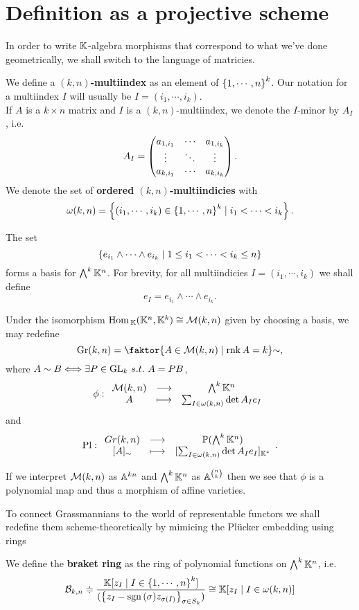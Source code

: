 \section{Definition as a projective scheme}
In order to write $\mathbb{K}$-algebra morphisms that correspond to what we've done geometrically, we shall switch to the language of matricies.
\begin{definition}[Multiindicies]
We define a \textbf{$(k,n)$-multiindex} as an element of $\left\{{1,\cdots, n}\right\}^k$. Our notation for a multiindex $I$ will usually be $I=(i_1,\cdots, i_k)$.\\
If $A$ is a $k\times n$ matrix and $I$ is a $(k,n)$-multiindex, we denote the $I$-minor by $A_I$, i.e.
\[A_I=\begin{pmatrix}a_{1,i_1} &\cdots &a_{1,i_{k}}\\\vdots &\ddots &\vdots\\a_{k,i_1}&\cdots&a_{k,i_k}\end{pmatrix}.\]
We denote the set of \textbf{ordered $(k,n)$-multiindicies} with
\[\omega(k,n)=\left\{{(i_1,\cdots, i_k)\in \left\{{1,\cdots, n}\right\}^k\mid i_1<\cdots<i_k}\right\}.\]
\end{definition}

\begin{remark}
The set
\[\left\{{e_{i_1}\wedge\cdots\wedge e_{i_k}\mid 1\leq i_1<\cdots<i_k\leq n}\right\}\]
forms a basis for $\bigwedge^k\mathbb{K}^n$. For brevity, for all multiindicies $I=(i_1,\cdots, i_k)$ we shall define
\[e_I=e_{i_1}\wedge\cdots\wedge e_{i_k}.\]
\end{remark}
\medskip

\noindent
Under the isomorphism $\mathrm{Hom}\,_{\mathbb{K}}(\mathbb{K}^n,\mathbb{K}^k)\cong \mathcal{M}(k,n)$ given by choosing a basis, we may redefine
\[\Gr(k,n)=\quot{\cpa{A\in \Mc(k,n)\mid \rnk A=k}}{\sim},\] 
where $A\sim B\Longleftrightarrow \exists P\in \mathrm{GL}_k\ s.t.\ A=PB$, 
\[\phi:\begin{array}{ccc} {\mathcal{M}(k,n)} & \longrightarrow & {\bigwedge^k\mathbb{K}^n}\\ {A} & \longmapsto & {\sum_{I\in \omega(k,n)}\det A_I e_I} \end{array}\]
and
\[\mathrm{Pl}:\begin{array}{ccc} {Gr(k,n)} & \longrightarrow & {\mathbb{P}(\bigwedge^k\mathbb{K}^n)}\\ {[A]_\sim} & \longmapsto & {[\sum_{I\in \omega(k,n)}\det A_I e_I]_{\mathbb{K}^\ast}} \end{array}.\]

\begin{remark}
If we interpret $\mathcal{M}(k,n)$ as $\mathbb{A}^{kn}$ and $\bigwedge^k\mathbb{K}^n$ as $\mathbb{A}^{\binom nk}$ then we see that $\phi$ is a polynomial map and thus a morphism of affine varieties.
\end{remark}


To connect Grassmannians to the world of representable functors we shall redefine them scheme-theoretically by mimicing the Pl\"ucker embedding using rings

\begin{definition}
We define the \textbf{braket ring} as the ring of polynomial functions on $\bigwedge^k\mathbb{K}^n$, i.e.
\[\mathcal{B}_{k,n}\doteqdot\frac{\mathbb{K}[z_I\mid I\in \left\{{1,\cdots, n}\right\}^k]}{(\left\{{z_I-\mathrm{sgn}\,(\sigma)z_{\sigma(I)}}\right\}_{\sigma\in S_k})}\cong \mathbb{K}[z_I\mid I\in \omega(k,n)]\]
\end{definition}

